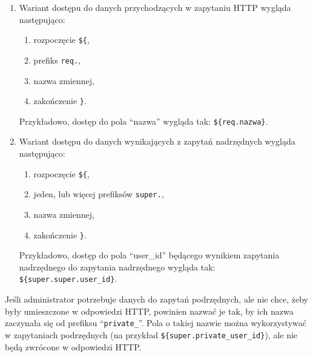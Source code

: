 \begin{enumerate}

    \item Wariant dostępu do danych przychodzących w zapytaniu HTTP wygląda
    następująco:

        \begin{enumerate}
            
            \item rozpoczęcie \verb|${|,

            \item prefiks \verb|req.|,

            \item nazwa zmiennej,

            \item zakończenie \verb|}|.
            
        \end{enumerate}

        Przykładowo, dostęp do pola ``nazwa'' wygląda tak: \verb|${req.nazwa}|.

    \item Wariant dostępu do danych wynikających z zapytań nadrzędnych wygląda
        następująco:

        \begin{enumerate}
            
            \item rozpoczęcie \verb|${|,

            \item jeden, lub więcej prefiksów \verb|super.|,

            \item nazwa zmiennej,

            \item zakończenie \verb|}|.
            
        \end{enumerate}

        Przykładowo, dostęp do pola ``user\_id'' będącego wynikiem zapytania
        nadrzędnego do zapytania nadrzędnego wygląda tak:
        \verb|${super.super.user_id}|.

\end{enumerate}

Jeśli administrator potrzebuje danych do zapytań podrzędnych, ale nie chce, żeby
były umieszczone w odpowiedzi HTTP, powinien nazwać je tak, by ich nazwa
zaczynała się od prefiksu ``\verb|private_|''. Pola o takiej nazwie można
wykorzystywać w zapytaniach podrzędnych (na przykład
\verb|${super.private_user_id}|), ale nie będą zwrócone w odpowiedzi HTTP.


